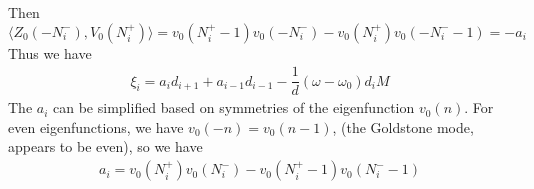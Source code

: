 \documentclass[12pt]{article}
\begin{document}
Then
\[
\langle Z_0(-N_i^-), V_0(N_i^+) \rangle 
= v_0(N_i^+ - 1)v_0(-N_i^-) - v_0(N_i^+)v_0(-N_i^- - 1) = -a_i
\]
Thus we have
\begin{align*}
\xi_i = a_i d_{i+1}
+ a_{i-1} d_{i-1}
- \dfrac{1}{d} (\omega - \omega_0) d_i M
\end{align*}
The $a_i$ can be simplified based on symmetries of the eigenfunction $v_0(n)$. For even eigenfunctions, we have $v_0(-n) = v_0(n-1)$, (the Goldstone mode, appears to be even), so we have
\begin{align}\label{eq:ai}
a_i = v_0(N_i^+)v_0(N_i^-) - v_0(N_i^+ - 1)v_0(N_i^- -1)
\end{align}









\end{document}
